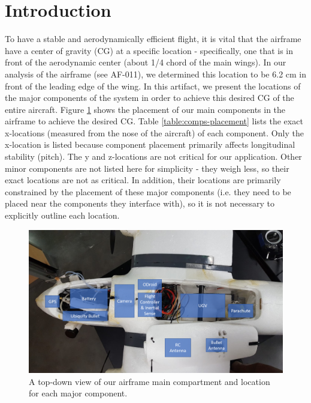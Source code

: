 \documentclass[]{auvsi_doc}
\begin{document}
	\begin{AUVSITitlePage}
		\begin{artifacttable}
		\end{artifacttable}
	\end{AUVSITitlePage}

	\section{Introduction}
	To have a stable and aerodynamically efficient flight, it is vital that the airframe have a center of gravity (CG) at a specific location - specifically, one that is in front of the aerodynamic center (about 1/4 chord of the main wings). In our analysis of the airframe (see AF-011), we determined this location to be 6.2 cm in front of the leading edge of the wing. In this artifact, we present the locations of the major components of the system in order to achieve this desired CG of the entire aircraft. Figure \ref{fig:comps} shows the placement of our main components in the airframe to achieve the desired CG. Table \ref{table:comps-placement} lists the exact x-locations (measured from the nose of the aircraft) of each component. Only the x-location is listed because component placement primarily affects longitudinal stability (pitch). The y and z-locations are not critical for our application. Other minor components are not listed here for simplicity - they weigh less, so their exact locations are not as critical. In addition, their locations are primarily constrained by the placement of these major components (i.e. they need to be placed near the components they interface with), so it is not necessary to explicitly outline each location. 

	\begin{figure}[h!]
		\centering
		
		\includegraphics[width=.9\columnwidth]{comps}
		\caption{A top-down view of our airframe main compartment and location for each major component.}
		\label{fig:comps}
	\end{figure}
\end{document}
